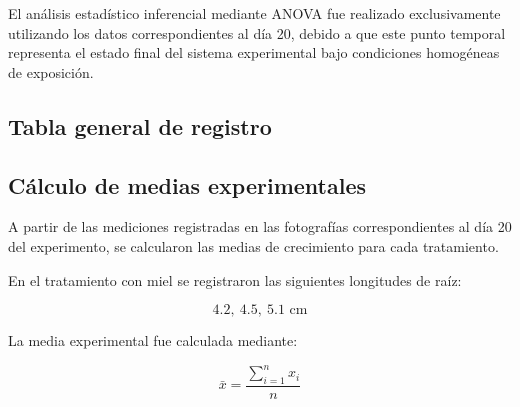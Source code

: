 El análisis estadístico inferencial mediante ANOVA fue realizado exclusivamente utilizando los datos correspondientes al día 20, debido a que este punto temporal representa el estado final del sistema experimental bajo condiciones homogéneas de exposición.

\subsection{Tabla general de registro}

\begin{table}[H]
\centering
{}
\caption{Registro experimental resumido}
\end{table}

\subsection{Cálculo de medias experimentales}

A partir de las mediciones registradas en las fotografías correspondientes al día 20 del experimento, se calcularon las medias de crecimiento para cada tratamiento.

En el tratamiento con miel se registraron las siguientes longitudes de raíz:

\[
4.2,\ 4.5,\ 5.1 \text{ cm}
\]

La media experimental fue calculada mediante:

\[
\bar{x}=\frac{\sum_{i=1}^{n}x_i}{n}
\]

